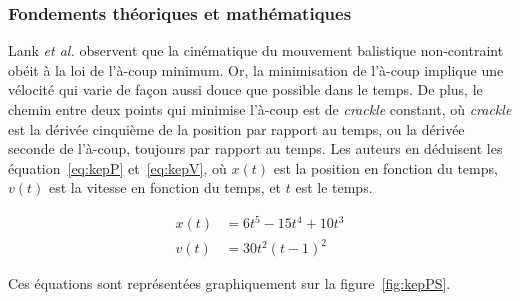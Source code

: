 \begin{appendices}
	
	\subsubsection{Fondements théoriques et mathématiques}
	Lank \emph{et al.} observent que la cinématique du mouvement balistique non-contraint obéit à la loi de l'à-coup minimum. Or, la minimisation de l'à-coup implique une vélocité qui varie de façon aussi \og douce \fg{} que possible dans le temps. De plus, le chemin entre deux points qui minimise l'à-coup est de \emph{crackle} constant, où \emph{crackle} est la dérivée cinquième de la position par rapport au temps, ou la dérivée seconde de l'à-coup, toujours par rapport au temps. Les auteurs en déduisent les équation~\ref{eq:kepP} et~\ref{eq:kepV}, où $x(t)$ est la position en fonction du temps, $v(t)$ est la vitesse en fonction du temps, et $t$ est le temps.
	
	\begin{align}
		\label{eq:kepP}
		x(t) &= 6t^{5} - 15t^{4} + 10t^{3} \\
		\label{eq:kepV}
		v(t) &= 30t^{2}(t - 1)^{2}
	\end{align}
	
	Ces équations sont représentées graphiquement sur la figure~\ref{fig:kepPS}.
	

\end{appendices}
